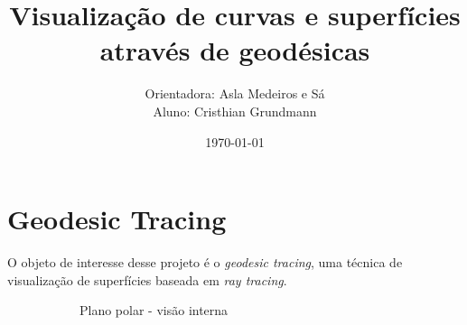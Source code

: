 \documentclass[10pt,a4paper]{article}
\title{Visualização de curvas e superfícies através de geodésicas}
\author{Orientadora: Asla Medeiros e Sá\\Aluno: Cristhian Grundmann}
\date{\today}
\begin{document}
\maketitle


\section*{Geodesic Tracing}
O objeto de interesse desse projeto é o \textit{geodesic tracing},
uma técnica de visualização de superfícies baseada em \textit{ray tracing}.

\begin{figure}[h!]
\centering
\begin{subfigure}{0.4\linewidth}
\caption{Plano polar - visão interna}
\end{subfigure}
\begin{subfigure}{0.4\linewidth}

\end{subfigure}
\end{figure}
\end{document}
